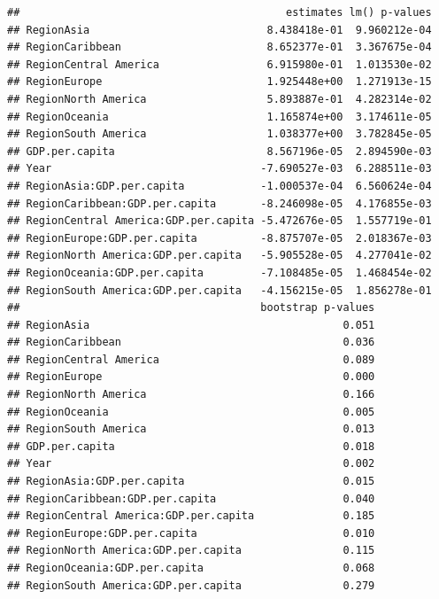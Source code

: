 \documentclass[11pt,]{article}
\newenvironment{Shaded}{\begin{snugshade}}{\end{snugshade}}
\newcommand{\CommentTok}[1]{\textcolor[rgb]{0.56,0.35,0.01}{\textit{#1}}}
\newcommand{\DecValTok}[1]{\textcolor[rgb]{0.00,0.00,0.81}{#1}}
\newcommand{\KeywordTok}[1]{\textcolor[rgb]{0.13,0.29,0.53}{\textbf{#1}}}
\newcommand{\NormalTok}[1]{#1}
\newcommand{\OperatorTok}[1]{\textcolor[rgb]{0.81,0.36,0.00}{\textbf{#1}}}
\newcommand{\StringTok}[1]{\textcolor[rgb]{0.31,0.60,0.02}{#1}}
\begin{document}
\begin{Shaded}
\end{Shaded}

\begin{verbatim}
##                                          estimates lm() p-values
## RegionAsia                            8.438418e-01  9.960212e-04
## RegionCaribbean                       8.652377e-01  3.367675e-04
## RegionCentral America                 6.915980e-01  1.013530e-02
## RegionEurope                          1.925448e+00  1.271913e-15
## RegionNorth America                   5.893887e-01  4.282314e-02
## RegionOceania                         1.165874e+00  3.174611e-05
## RegionSouth America                   1.038377e+00  3.782845e-05
## GDP.per.capita                        8.567196e-05  2.894590e-03
## Year                                 -7.690527e-03  6.288511e-03
## RegionAsia:GDP.per.capita            -1.000537e-04  6.560624e-04
## RegionCaribbean:GDP.per.capita       -8.246098e-05  4.176855e-03
## RegionCentral America:GDP.per.capita -5.472676e-05  1.557719e-01
## RegionEurope:GDP.per.capita          -8.875707e-05  2.018367e-03
## RegionNorth America:GDP.per.capita   -5.905528e-05  4.277041e-02
## RegionOceania:GDP.per.capita         -7.108485e-05  1.468454e-02
## RegionSouth America:GDP.per.capita   -4.156215e-05  1.856278e-01
##                                      bootstrap p-values
## RegionAsia                                        0.051
## RegionCaribbean                                   0.036
## RegionCentral America                             0.089
## RegionEurope                                      0.000
## RegionNorth America                               0.166
## RegionOceania                                     0.005
## RegionSouth America                               0.013
## GDP.per.capita                                    0.018
## Year                                              0.002
## RegionAsia:GDP.per.capita                         0.015
## RegionCaribbean:GDP.per.capita                    0.040
## RegionCentral America:GDP.per.capita              0.185
## RegionEurope:GDP.per.capita                       0.010
## RegionNorth America:GDP.per.capita                0.115
## RegionOceania:GDP.per.capita                      0.068
## RegionSouth America:GDP.per.capita                0.279
\end{verbatim}
\end{document}
